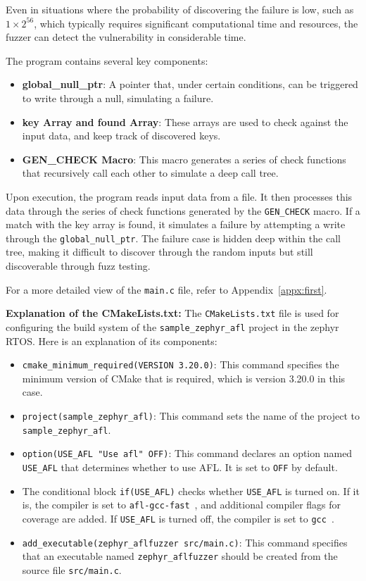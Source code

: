 Even in situations where the probability of discovering the failure is low,
such as \(1 \times 2^{56}\), which typically requires significant computational
time and resources, the fuzzer can detect the vulnerability in considerable time.

The program contains several key components:

\begin{itemize}
\item \textbf{global\_null\_ptr}: A pointer that, under certain conditions,
can be triggered to write through a null, simulating a failure.
\item \textbf{key Array and found Array}: These arrays are used to check against
the input data, and keep track of discovered keys.
\item \textbf{GEN\_CHECK Macro}: This macro generates a series of check
functions that recursively call each other to simulate a deep call tree.
\end{itemize}

Upon execution, the program reads input data from a file. It then processes
this data through the series of check functions generated by
the \texttt{GEN\_CHECK} macro. If a match with the key array is found,
it simulates a failure by attempting a write through the \texttt{global\_null\_ptr}.
The failure case is hidden deep within the call tree, making it difficult to
discover through the random inputs but still discoverable through fuzz testing.

For a more detailed view of the \texttt{main.c} file, refer to
Appendix~\ref{appx:first}.

\textbf{Explanation of the CMakeLists.txt:}
The \texttt{CMakeLists.txt} file is used for configuring the build system
of the \texttt{sample\_zephyr\_afl} project in the zephyr RTOS. Here is an
explanation of its components:

\begin{itemize}
    \item \texttt{cmake\_minimum\_required(VERSION 3.20.0)}: This command
    specifies the minimum version of CMake that is required, which is version
    3.20.0 in this case.
    \item \texttt{project(sample\_zephyr\_afl)}: This command sets the name
    of the project to \texttt{sample\_zephyr\_afl}.
    \item \texttt{option(USE\_AFL "Use afl" OFF)}: This command declares an
    option named \texttt{USE\_AFL} that determines whether to use AFL. It is
    set to \texttt{OFF} by default.
    \item The conditional block \texttt{if(USE\_AFL)} checks
    whether \texttt{USE\_AFL} is turned on. If it is, the compiler is
    set to \texttt{afl-gcc-fast}~\cite{AFLplusp13:online}, and additional
    compiler flags for coverage are added. If \texttt{USE\_AFL} is turned off,
    the compiler is set to \texttt{gcc}~\cite{GCCtheGN9:online}.
    \item \texttt{add\_executable(zephyr\_aflfuzzer src/main.c)}: This
    command specifies that an executable named \texttt{zephyr\_aflfuzzer}
    should be created from the source file \texttt{src/main.c}.
\end{itemize}

